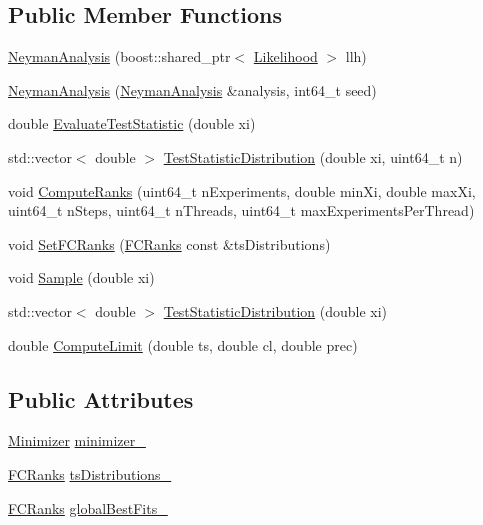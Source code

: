 \subsection*{Public Member Functions}
\begin{DoxyCompactItemize}
\item 
\hyperlink{classNeymanAnalysis_ab02f708099c866f0b3dabf529222846e}{Neyman\-Analysis} (boost\-::shared\-\_\-ptr$<$ \hyperlink{classLikelihood}{Likelihood} $>$ llh)
\item 
\hyperlink{classNeymanAnalysis_aa84832be2ad6a77d4570f90768ce6f12}{Neyman\-Analysis} (\hyperlink{classNeymanAnalysis}{Neyman\-Analysis} \&analysis, int64\-\_\-t seed)
\item 
double \hyperlink{classNeymanAnalysis_ab96261fccdce568c5f49c9caa3f6e585}{Evaluate\-Test\-Statistic} (double xi)
\item 
std\-::vector$<$ double $>$ \hyperlink{classNeymanAnalysis_af1382c7a6b0a799adb9b5cba89142c7e}{Test\-Statistic\-Distribution} (double xi, uint64\-\_\-t n)
\item 
void \hyperlink{classNeymanAnalysis_a850688639ff1232d73b1b99e8d1a828d}{Compute\-Ranks} (uint64\-\_\-t n\-Experiments, double min\-Xi, double max\-Xi, uint64\-\_\-t n\-Steps, uint64\-\_\-t n\-Threads, uint64\-\_\-t max\-Experiments\-Per\-Thread)
\item 
void \hyperlink{classNeymanAnalysis_a517570cbdf64019af5543cc175ce271f}{Set\-F\-C\-Ranks} (\hyperlink{classFCRanks}{F\-C\-Ranks} const \&ts\-Distributions)
\item 
void \hyperlink{classNeymanAnalysis_a48a2e22b564fcf5d001d5b397a778319}{Sample} (double xi)
\item 
std\-::vector$<$ double $>$ \hyperlink{classNeymanAnalysis_a210d3928ce874e3a1cb7667fb6c30746}{Test\-Statistic\-Distribution} (double xi)
\item 
double \hyperlink{classNeymanAnalysis_a32e7f796020e908bef11bf1b6fed9aa0}{Compute\-Limit} (double ts, double cl, double prec)
\end{DoxyCompactItemize}
\subsection*{Public Attributes}
\begin{DoxyCompactItemize}
\item 
\hyperlink{classMinimizer}{Minimizer} \hyperlink{classNeymanAnalysis_ab7b0eaaf2cb5b407f1496a745111f28e}{minimizer\-\_\-}
\item 
\hyperlink{classFCRanks}{F\-C\-Ranks} \hyperlink{classNeymanAnalysis_ab7b43994330c276c03a30dbb0e7f02cd}{ts\-Distributions\-\_\-}
\item 
\hyperlink{classFCRanks}{F\-C\-Ranks} \hyperlink{classNeymanAnalysis_a1e239edced6826a979c0e2c541060ecf}{global\-Best\-Fits\-\_\-}
\end{DoxyCompactItemize}


